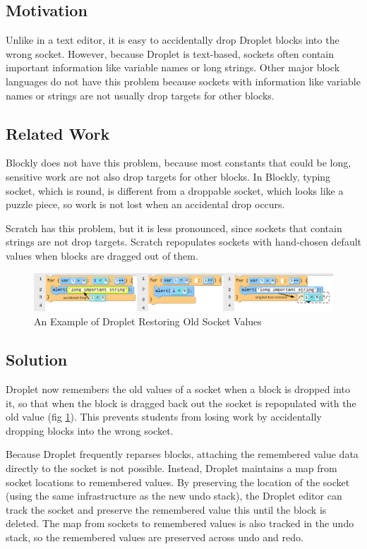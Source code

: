 \documentclass[conference]{IEEEtran}
\begin{document}
\subsection{Motivation}
Unlike in a text editor, it is easy to accidentally drop Droplet blocks into the wrong socket. However, because Droplet is text-based, sockets often contain important information like variable names or long strings. Other major block languages do not have this problem because sockets with information like variable names or strings are not usually drop targets for other blocks.

\subsection{Related Work}
Blockly does not have this problem, because most constants that could be long, sensitive work are not also drop targets for other blocks. In Blockly, typing socket, which is round, is different from a droppable socket, which looks like a puzzle piece, so work is not lost when an accidental drop occurs.

Scratch has this problem, but it is less pronounced, since sockets that contain strings are not drop targets. Scratch repopulates sockets with hand-chosen default values when blocks are dragged out of them.

\begin{figure}
\centering
\includegraphics[width=5in]{remember-socket.png}
\caption{An Example of Droplet Restoring Old Socket Values}
\label{remember-socket}
\end{figure}

\subsection{Solution}
Droplet now remembers the old values of a socket when a block is dropped into it, so that when the block is dragged back out the socket is repopulated with the old value (fig \ref{remember-socket}). This prevents students from losing work by accidentally dropping blocks into the wrong socket.

Because Droplet frequently reparses blocks, attaching the remembered value data directly to the socket is not possible. Instead, Droplet maintains a map from socket locations to remembered values. By preserving the location of the socket (using the same infrastructure as the new undo stack), the Droplet editor can track the socket and preserve the remembered value this until the block is deleted. The map from sockets to remembered values is also tracked in the undo stack, so the remembered values are preserved across undo and redo.
\end{document}
